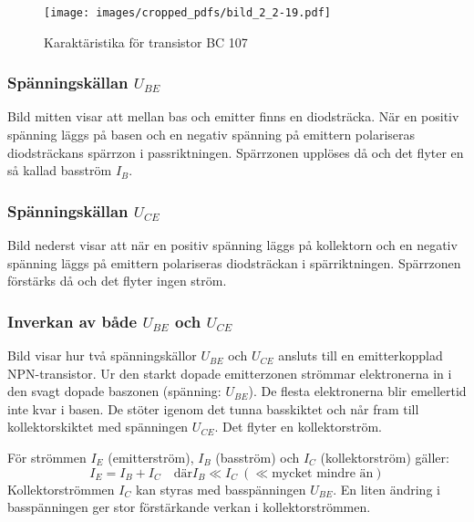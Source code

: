 \begin{figure*}[p]
  \begin{center}
    \texttt{[image: images/cropped\_pdfs/bild\_2\_2-19.pdf]}
    \caption{Karaktäristika för transistor BC 107}
    \label{fig:BildII2-19}
  \end{center}
\end{figure*}


\subsubsection{Spänningskällan \(U_{BE}\)}

Bild  mitten visar att mellan bas och emitter finns en diodsträcka.
När en positiv spänning läggs på basen och en negativ spänning på emittern polariseras diodsträckans spärrzon i passriktningen.
Spärrzonen upplöses då och det flyter en så kallad basström \(I_B\).

\subsubsection{Spänningskällan \(U_{CE}\)}

Bild  nederst visar att när en positiv spänning läggs på kollektorn och en negativ spänning läggs på emittern polariseras diodsträckan i spärriktningen.
Spärrzonen förstärks då och det flyter ingen ström.

\newpage
\subsubsection{Inverkan av både \(U_{BE}\) och \(U_{CE}\)}

Bild  visar hur två spänningskällor \(U_{BE}\) och
\(U_{CE}\) ansluts till en emitterkopplad NPN-transistor.
Ur den starkt dopade emitterzonen strömmar elektronerna in i den svagt dopade
baszonen (spänning: \(U_{BE}\)).
De flesta elektronerna blir emellertid inte kvar i basen.
De stöter igenom det tunna basskiktet och når fram till
kollektorskiktet med spänningen \(U_{CE}\). Det flyter en kollektorström.

För strömmen \(I_E\) (emitterström), \(I_B\) (basström) och \(I_C\)
(kollektorström) gäller:
\[I_E = I_B + I_C\quad \text{där} I_B \ll I_C\ (\ll \text{mycket mindre än})\]
Kollektorströmmen \(I_C\) kan styras med basspänningen \(U_{BE}\).
En liten ändring i basspänningen ger stor förstärkande verkan i
kollektorströmmen.

